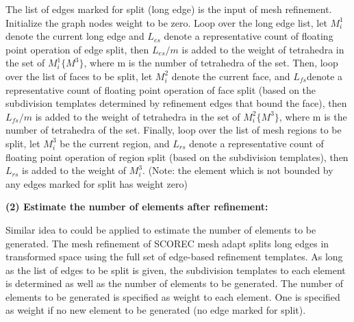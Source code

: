The list of edges marked for split (long edge) is the input of mesh
refinement. Initialize the graph nodes weight to be zero. Loop over the
long edge list, let \begin{math}M_i^1 \end{math} denote the current long edge
and \begin{math}L_{es} \end{math} denote a representative count of floating point operation
of edge split, then \begin{math}L_{es}/m\end{math} is added
  to the weight of tetrahedra in the set of
  \begin{math}M_i^1\{M^3\}\end{math}, where m is the number of
  tetrahedra of the set. Then, loop over the list of faces to be split, let
  \begin{math}M_i^2\end{math} denote the current face, and
    \begin{math}L_{fs}\end{math}denote a representative count of floating point operation
    of face split (based on the subdivision templates determined by
    refinement edges that bound the face), then \begin{math}L_{fs}/m\end{math} is added
  to the weight of tetrahedra in the set of
  \begin{math}M_i^2\{M^3\}\end{math}, where m is the number of
  tetrahedra of the set. Finally, loop over the list of mesh regions to be split,
  let \begin{math}M_i^3\end{math} be the current region, and
  \begin{math}L_{rs}\end{math} denote a representative count of floating point operation of
  region split (based on the subdivision templates), then
  \begin{math}L_{rs}\end{math} is added to the weight of
  \begin{math}M_i^3\end{math}. (Note: the element which is not bounded
    by any edges marked for split has weight zero) 

{\bf (2) Estimate the number of elements after refinement:}

Similar idea to \cite{Flaherty} could be applied to estimate the number of
elements to be generated. The mesh refinement of SCOREC mesh adapt splits long edges in
transformed space using the full set of edge-based refinement
templates. As long as the list of edges to be split is given, the
subdivision templates to each element is determined as well as the
number of elements to be generated. The number of elements to be
generated is specified as weight to each element. One is
specified as weight if no new element to be generated (no edge marked for
split). 

